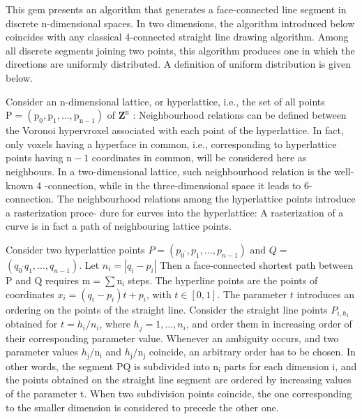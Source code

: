 \begin{CJK}{UTF8}{gbsn}
This gem presents an algorithm that generates a face-connected line segment in discrete n-dimensional spaces. In two dimensions, the algorithm introduced below coincides with any classical 4-connected straight line drawing algorithm. Among all discrete segments joining two points, this algorithm produces one in which the directions are uniformly distributed. A definition of uniform distribution is given below.

Consider an n-dimensional lattice, or hyperlattice, i.e., the set of all points $\mathrm{P}=\left(\mathrm{p}_{0}, \mathrm{p}_{1}, \ldots, \mathrm{p}_{\mathrm{n}-1}\right)$ of $\mathbf{Z}^{\mathrm{n}}$ : Neighbourhood relations can be defined between the Voronoi hypervroxel associated with each point of the hyperlattice. In fact, only voxels having a hyperface in common, i.e., corresponding to hyperlattice points having $\mathrm{n}-1$ coordinates in common, will be considered here as neighbours. In a two-dimensional lattice, such neighbourhood relation is the well-known 4 -connection, while in the three-dimensional space it leads to 6-connection. The neighbourhood relations among the hyperlattice points introduce a rasterization proce- dure for curves into the hyperlattice: A rasterization of a curve is in fact a path of neighbouring lattice points.

Consider two hyperlattice points $P=\left(p_{0^{\prime}}, p_{1}, \ldots, p_{n-1}\right)$ and $Q=$ $\left(q_{0^{\prime}} q_{1}, \ldots, q_{n-1}\right)$. Let $n_{i}=\left|q_{i}-p_{i}\right|$ Then a face-connected shortest path between $\mathrm{P}$ and $\mathrm{Q}$ requires $\mathrm{m}=\sum \mathrm{n}_{\mathrm{i}}$ steps. The hyperline points are the points of coordinates $x_{i}=\left(q_{i}-p_{i}\right) t+p_{i}$, with $t \in[0,1]$. The parameter $t$ introduces an ordering on the points of the straight line. Consider the straight line points $P_{i, h_{1}}$ obtained for $t=h_{i} / n_{i}$, where $h_{j}=1, \ldots, n_{i}$, and order them in increasing order of their corresponding parameter value. Whenever an ambiguity occurs, and two parameter values $h_{\mathrm{j}} / \mathrm{n}_{\mathrm{i}}$ and $h_{\mathrm{j}} / \mathrm{n}_{\mathrm{j}}$ coincide, an arbitrary order has to be chosen. In other words, the segment $\mathrm{PQ}$ is subdivided into $\mathrm{n}_{\mathrm{i}}$ parts for each dimension i, and the points obtained on the straight line segment are ordered by increasing values of the parameter t. When two subdivision points coincide, the one corresponding to the smaller dimension is considered to precede the other one.


\end{CJK}
